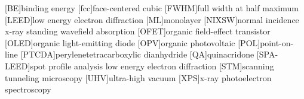 \begin{acronym}
    [BE]{binding energy}
    [fcc]{face-centered cubic}
    [FWHM]{full width at half maximum}
    [LEED]{low energy electron diffraction}
    [ML]{monolayer}
    [NIXSW]{normal incidence x-ray standing wavefield absorption}
    [OFET]{organic field-effect transistor}
    [OLED]{organic light-emitting diode}
    [OPV]{organic photovoltaic}
    [POL]{point-on-line}
    [PTCDA]{perylenetetracarboxylic dianhydride}
    [QA]{quinacridone}
    [SPA-LEED]{spot profile analysis low energy electron diffraction}
    [STM]{scanning tunneling microscopy}
    [UHV]{ultra-high vacuum}
    [XPS]{x-ray photoelectron spectroscopy}
\end{acronym}




